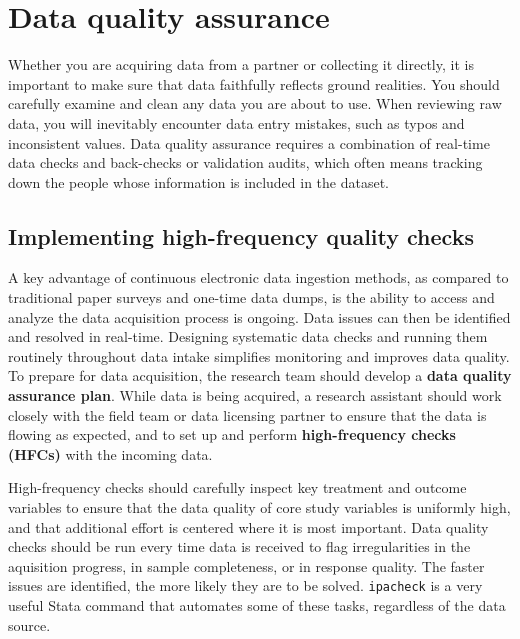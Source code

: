 \section{Data quality assurance}

Whether you are acquiring data from a partner or collecting it directly,
it is important to make sure that data faithfully reflects ground realities.
You should carefully examine and clean any data you are about to use.
When reviewing raw data, you will inevitably encounter data entry mistakes,
such as typos and inconsistent values.
Data quality assurance requires a combination of real-time data checks
and back-checks or validation audits, which often means tracking down
the people whose information is included in the dataset.

\subsection{Implementing high-frequency quality checks}

A key advantage of continuous electronic data ingestion methods,
as compared to traditional paper surveys and one-time data dumps,
is the ability to access and analyze the data acquisition process is ongoing.
Data issues can then be identified and resolved in real-time.
Designing systematic data checks and running them routinely throughout data intake
simplifies monitoring and improves data quality.
To prepare for data acquisition,
the research team should develop a \textbf{data quality assurance plan}.
While data is being acquired,
a research assistant should work closely with the field team or data licensing partner
to ensure that the data is flowing as expected,
and to set up and perform \textbf{high-frequency checks (HFCs)} with the incoming data.

High-frequency checks should carefully inspect key treatment and outcome variables
to ensure that the data quality of core study variables is uniformly high,
and that additional effort is centered where it is most important.
Data quality checks should be run every time data is received
to flag irregularities in the aquisition progress, in sample completeness, or in response quality.
The faster issues are identified, the more likely they are to be solved.
\texttt{ipacheck}
is a very useful Stata command that automates some of these tasks,
regardless of the data source.

